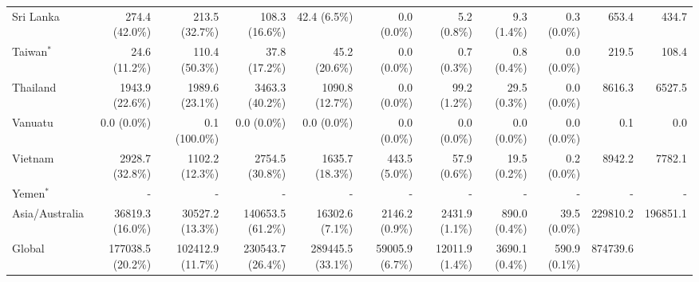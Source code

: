 \begin{scriptsize}
\begin{landscape}
\begin{center}
\begin{longtable}[ht]{lrrrrrrrrrr}
			Sri Lanka&274.4 (42.0\%)&213.5 (32.7\%)&108.3 (16.6\%)&42.4 (6.5\%)&0.0 (0.0\%)&5.2 (0.8\%)&9.3 (1.4\%)&0.3 (0.0\%)&653.4&434.7\\
			Taiwan$^*$&24.6 (11.2\%)&110.4 (50.3\%)&37.8 (17.2\%)&45.2 (20.6\%)&0.0 (0.0\%)&0.7 (0.3\%)&0.8 (0.4\%)&0.0 (0.0\%)&219.5&108.4\\
			Thailand&1943.9 (22.6\%)&1989.6 (23.1\%)&3463.3 (40.2\%)&1090.8 (12.7\%)&0.0 (0.0\%)&99.2 (1.2\%)&29.5 (0.3\%)&0.0 (0.0\%)&8616.3&6527.5\\
			Vanuatu&0.0 (0.0\%)&0.1 (100.0\%)&0.0 (0.0\%)&0.0 (0.0\%)&0.0 (0.0\%)&0.0 (0.0\%)&0.0 (0.0\%)&0.0 (0.0\%)&0.1&0.0\\
			Vietnam&2928.7 (32.8\%)&1102.2 (12.3\%)&2754.5 (30.8\%)&1635.7 (18.3\%)&443.5 (5.0\%)&57.9 (0.6\%)&19.5 (0.2\%)&0.2 (0.0\%)&8942.2&7782.1\\
			Yemen$^*$&-&-&-&-&-&-&-&-&-&-\\\hline
			Asia/Australia&36819.3 (16.0\%)&30527.2 (13.3\%)&140653.5 (61.2\%)&16302.6 (7.1\%)&2146.2 (0.9\%)&2431.9 (1.1\%)&890.0 (0.4\%)&39.5 (0.0\%)&229810.2&196851.1\\\hline

			Global&177038.5 (20.2\%)&102412.9 (11.7\%)&230543.7 (26.4\%)&289445.5 (33.1\%)&59005.9 (6.7\%)&12011.9 (1.4\%)&3690.1 (0.4\%)&590.9 (0.1\%)&874739.6&\\
			\end{longtable}
		\end{center}
	\end{landscape}
\end{scriptsize}